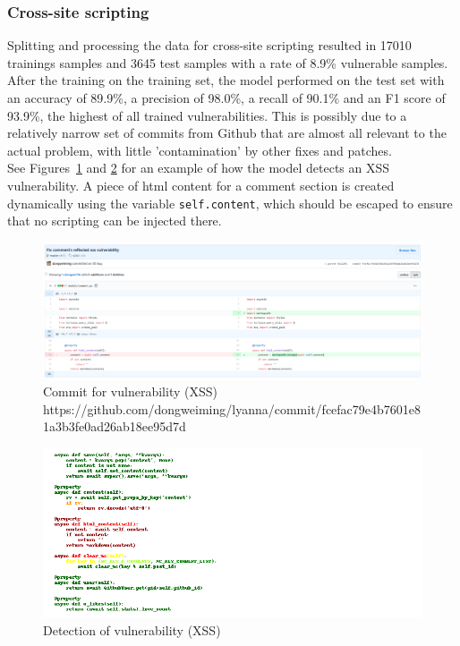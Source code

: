 \documentclass[
a4paper,
pagesize,
pdftex,
12pt,
twoside, %
BCOR=5mm, %
ngerman,
fleqn,
final,
]{scrartcl}
\begin{document}
	
	\subsubsection{Cross-site scripting}
	Splitting and processing the data for cross-site scripting resulted in 17010 trainings samples and 3645 test samples with a rate of 8.9\% vulnerable samples. After the training on the training set, the model performed on the test set with an accuracy of 89.9\%, a precision of 98.0\%, a recall of 90.1\% and an F1 score of 93.9\%, the highest of all trained vulnerabilities. This is possibly due to a relatively narrow set of commits from Github that are almost all relevant to the actual problem, with little 'contamination' by other fixes and patches.\\
	See Figures~\ref{fig:xssA} and \ref{fig:xssAr} for an example of how the model detects an XSS vulnerability. A piece of html content for a comment section is created dynamically using the variable \texttt{self.content}, which should be escaped to ensure that no scripting can be injected there.
	
	\begin{figure}[H]
		\centering
		\includegraphics[width=\linewidth]{Images/xssA}
		\caption{Commit for vulnerability (XSS) \newline \scriptsize{https://github.com/dongweiming/lyanna/commit/fcefac79e4b7601e81a3b3fe0ad26ab18ee95d7d}}
		\label{fig:xssA}
	\end{figure}
	\begin{figure}[H]
		\centering
		\includegraphics[width=\linewidth]{Images/xssAr}
		\caption{Detection of vulnerability (XSS)}
		\label{fig:xssAr}
	\end{figure}
	
\end{document}
